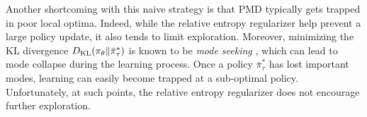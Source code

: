 Another shortcoming with this naive strategy is 
that PMD typically gets trapped in poor local optima.
Indeed, while the relative entropy regularizer help prevent
a large policy update, it also tends to limit exploration.
Moreover, minimizing the KL divergence
$D_{\mathrm{KL}}(\pi_\theta \| \bar{\pi}_\tau^*)$
is known to be \emph{mode seeking} \citep{kevin2012machine},
which can lead to mode collapse during the learning process.
Once a policy $\bar{\pi}_\tau^*$ has lost important modes,
learning can easily become trapped at a sub-optimal policy.
Unfortunately, at such points,
the relative entropy regularizer does not encourage further exploration.

